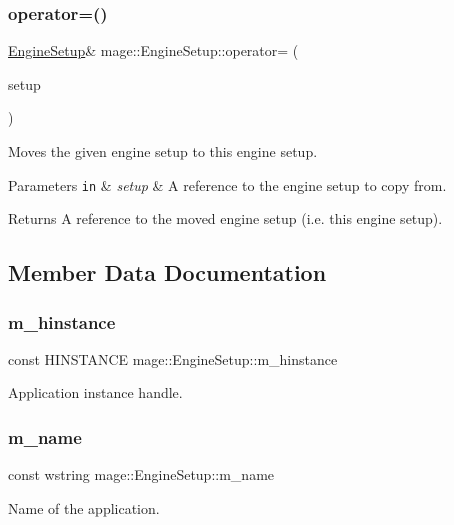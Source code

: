 \subsubsection{\texorpdfstring{operator=()}{operator=()}\hspace{0.1cm}{\footnotesize\ttfamily [2/2]}}
{\footnotesize\ttfamily \hyperlink{structmage_1_1_engine_setup}{Engine\+Setup}\& mage\+::\+Engine\+Setup\+::operator= (\begin{DoxyParamCaption}\item[{\hyperlink{structmage_1_1_engine_setup}{Engine\+Setup} \&\&}]{setup }\end{DoxyParamCaption})\hspace{0.3cm}{\ttfamily [delete]}}

Moves the given engine setup to this engine setup.


\begin{DoxyParams}[1]{Parameters}
\mbox{\tt in}  & {\em setup} & A reference to the engine setup to copy from. \\
\hline
\end{DoxyParams}
\begin{DoxyReturn}{Returns}
A reference to the moved engine setup (i.\+e. this engine setup). 
\end{DoxyReturn}


\subsection{Member Data Documentation}
\hypertarget{structmage_1_1_engine_setup_a678360078479bc3fee6bed4617caebbf}{}\label{structmage_1_1_engine_setup_a678360078479bc3fee6bed4617caebbf} 
\subsubsection{\texorpdfstring{m\+\_\+hinstance}{m\_hinstance}}
{\footnotesize\ttfamily const H\+I\+N\+S\+T\+A\+N\+CE mage\+::\+Engine\+Setup\+::m\+\_\+hinstance\hspace{0.3cm}{\ttfamily [private]}}

Application instance handle. \hypertarget{structmage_1_1_engine_setup_a40fba981d4b1c30eff304b029a013009}{}\label{structmage_1_1_engine_setup_a40fba981d4b1c30eff304b029a013009} 
\subsubsection{\texorpdfstring{m\+\_\+name}{m\_name}}
{\footnotesize\ttfamily const wstring mage\+::\+Engine\+Setup\+::m\+\_\+name\hspace{0.3cm}{\ttfamily [private]}}

Name of the application. 
